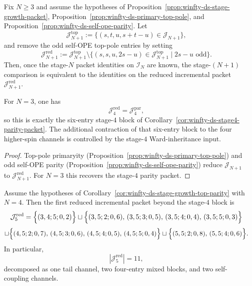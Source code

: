\begin{corollary}
\label{cor:winfty-ds-stage-growth-top-parity}
Fix $N \ge 3$ and assume the hypotheses of
Proposition~\ref{prop:winfty-ds-stage-growth-packet},
Proposition~\ref{prop:winfty-ds-primary-top-pole}, and
Proposition~\ref{prop:winfty-ds-self-ope-parity}. Let
\[
\mathcal{J}_{N+1}^{\mathrm{top}}
:=
\{(s,t,u,s+t-u)\in \mathcal{J}_{N+1}\},
\]
and remove the odd self-OPE top-pole entries by setting
\[
\mathcal{J}_{N+1}^{\mathrm{red}}
:=
\mathcal{J}_{N+1}^{\mathrm{top}}
\setminus
\bigl\{(s,s,u,2s-u)\in\mathcal{J}_{N+1}^{\mathrm{top}}
\mid 2s-u \text{ odd}\bigr\}.
\]
Then, once the stage-$N$ packet identities on $\mathcal{I}_N$ are
known, the stage-$(N+1)$ comparison is equivalent to the identities on
the reduced incremental packet
$\mathcal{J}_{N+1}^{\mathrm{red}}$.

For $N=3$, one has
\[
\mathcal{J}_4^{\mathrm{red}}
=
\mathcal{J}_4^{\mathrm{par}},
\]
so this is exactly the six-entry stage-$4$ block of
Corollary~\ref{cor:winfty-ds-stage4-parity-packet}. The additional
contraction of that six-entry block to the four higher-spin channels is
controlled by the stage-$4$ Ward-inheritance input.
\end{corollary}

\begin{proof}
Top-pole primaryity (Proposition~\ref{prop:winfty-ds-primary-top-pole}) and odd self-OPE parity (Proposition~\ref{prop:winfty-ds-self-ope-parity}) reduce $\mathcal{J}_{N+1}$ to $\mathcal{J}_{N+1}^{\mathrm{red}}$. For $N=3$ this recovers the stage-$4$ parity packet.
\end{proof}

\begin{corollary}
\label{cor:winfty-ds-stage5-reduced-packet}
Assume the hypotheses of
Corollary~\ref{cor:winfty-ds-stage-growth-top-parity} with $N=4$.
Then the first reduced incremental packet beyond the stage-$4$ block is
\[
\mathcal{J}_5^{\mathrm{red}}
=
\Bigl\{
(3,4;5;0,2)
\Bigr\}
\sqcup
\Bigl\{
(3,5;2;0,6),\,
(3,5;3;0,5),\,
(3,5;4;0,4),\,
(3,5;5;0,3)
\Bigr\}
\]
\[
\sqcup
\Bigl\{
(4,5;2;0,7),\,
(4,5;3;0,6),\,
(4,5;4;0,5),\,
(4,5;5;0,4)
\Bigr\}
\sqcup
\Bigl\{
(5,5;2;0,8),\,
(5,5;4;0,6)
\Bigr\}.
\]
In particular,
\[
|\mathcal{J}_5^{\mathrm{red}}|=11,
\]
decomposed as one tail channel, two four-entry mixed blocks, and two
self-coupling channels.
\end{corollary}

